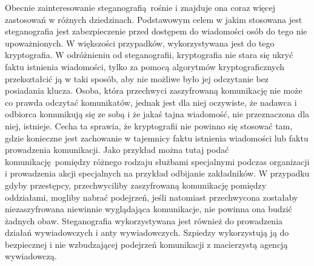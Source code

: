 \documentclass[a4paper, twoside]{report}
\begin{document}
        Obecnie zainteresowanie steganografią rośnie i znajduje ona coraz więcej
        zastosowań w różnych dziedzinach. Podstawowym celem w jakim stosowana jest
        steganografia jest zabezpieczenie przed dostępem do wiadomości osób do tego nie
        upoważnionych. W większości przypadków, wykorzystywana jest do tego
        kryptografia. W odróżnieniu od steganografii, kryptografia nie stara się
        ukryć faktu istnienia wiadomości, tylko za pomocą algorytmów kryptograficznych
        przekształcić ją w taki sposób, aby nie możliwe było jej odczytanie bez posiadania
        klucza. Osoba, która przechwyci zaszyfrowaną komunikację nie może co prawda
        odczytać komunikatów, jednak jest dla niej oczywiste, że nadawca i odbiorca
        komunikują się ze sobą i że jakaś tajna wiadomość, nie przeznaczona dla niej,
        istnieje.\cite{DIGITALWATERMARKING} Cecha ta sprawia, że kryptografii nie
        powinno się stosować tam, gdzie konieczne jest zachowanie w tajemnicy
        faktu istnienia wiadomości lub faktu prowadzenia komunikacji. Jako przykład
        można tutaj podać komunikację pomiędzy różnego rodzaju służbami specjalnymi
        podczas organizacji i prowadzenia akcji specjalnych na przykład odbijanie zakładników.
        W przypadku gdyby przestępcy, przechwyciliby zaszyfrowaną komunikację
        pomiędzy oddziałami, mogliby nabrać podejrzeń, jeśli natomiast przechwycona
        zostałaby niezaszyfrowana niewinnie wyglądająca komunikacje, nie powinna ona
        budzić żadnych obaw. Steganografia wykorzystywana jest również do prowadzenia
        działań wywiadowczych i anty wywiadowczych. Szpiedzy wykorzystują ją do
        bezpiecznej i nie wzbudzającej podejrzeń komunikacji z macierzystą agencją
        wywiadowczą.
\end{document}
